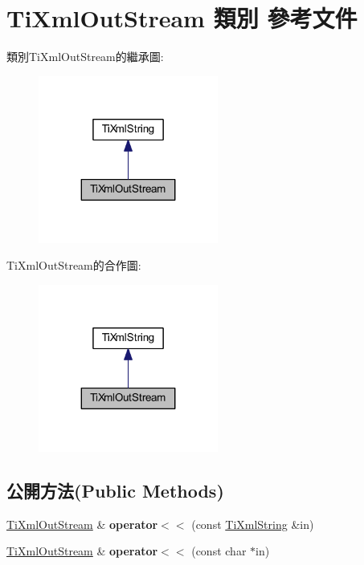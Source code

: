\hypertarget{class_ti_xml_out_stream}{}\section{Ti\+Xml\+Out\+Stream 類別 參考文件}
\label{class_ti_xml_out_stream}


類別\+Ti\+Xml\+Out\+Stream的繼承圖\+:\nopagebreak
\begin{figure}[H]
\begin{center}
\leavevmode
\includegraphics[width=167pt]{class_ti_xml_out_stream__inherit__graph}
\end{center}
\end{figure}


Ti\+Xml\+Out\+Stream的合作圖\+:\nopagebreak
\begin{figure}[H]
\begin{center}
\leavevmode
\includegraphics[width=167pt]{class_ti_xml_out_stream__coll__graph}
\end{center}
\end{figure}
\subsection*{公開方法(Public Methods)}
\begin{DoxyCompactItemize}
\item 
\hyperlink{class_ti_xml_out_stream}{Ti\+Xml\+Out\+Stream} \& {\bfseries operator$<$$<$} (const \hyperlink{class_ti_xml_string}{Ti\+Xml\+String} \&in)\hypertarget{class_ti_xml_out_stream_a3640dcb1c0903be3bc6966cdc9a79db6}{}\label{class_ti_xml_out_stream_a3640dcb1c0903be3bc6966cdc9a79db6}

\item 
\hyperlink{class_ti_xml_out_stream}{Ti\+Xml\+Out\+Stream} \& {\bfseries operator$<$$<$} (const char $\ast$in)\hypertarget{class_ti_xml_out_stream_af2117e5a8cbfcb69544804ad2859bfb6}{}\label{class_ti_xml_out_stream_af2117e5a8cbfcb69544804ad2859bfb6}

\end{DoxyCompactItemize}
